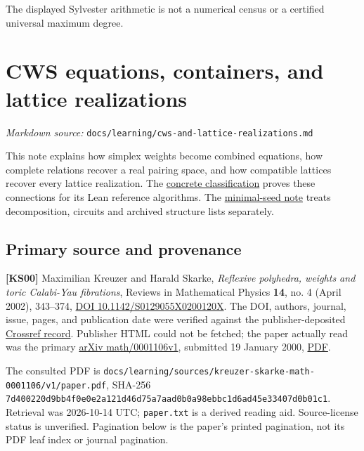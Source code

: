 \documentclass[11pt,a4paper,oneside]{report}
\begin{document}
The displayed Sylvester arithmetic is not a numerical census or a
certified universal maximum degree.

\chapter{CWS equations, containers, and lattice
realizations}\label{cws-and-lattice-realizations--cws-equations-containers-and-lattice-realizations}

\noindent\textit{Markdown source: }\texttt{docs/\allowbreak{}learning\allowbreak{}/\allowbreak{}cws-\allowbreak{}and-\allowbreak{}lattice-\allowbreak{}realizat\allowbreak{}ions.\allowbreak{}md}

This note explains how simplex weights become combined equations, how
complete relations recover a real pairing space, and how compatible
lattices recover every lattice realization. The
\href{../../proofs/STATEMENTS.md}{concrete classification} proves these
connections for its Lean reference algorithms. The
\hyperref[minimal-ip-circuits-and-types--minimal-ip-seeds-positive-circuits-and-finite-structure-data]{minimal-seed
note} treats decomposition, circuits and archived structure lists
separately.

\section{Primary source and
provenance}\label{cws-and-lattice-realizations--primary-source-and-provenance}

\textbf{{[}KS00{]}} Maximilian Kreuzer and Harald Skarke,
\emph{Reflexive polyhedra, weights and toric Calabi-Yau fibrations},
Reviews in Mathematical Physics \textbf{14}, no. 4 (April 2002),
343--374, \href{https://doi.org/10.1142/S0129055X0200120X}{DOI
10.\allowbreak{}1142/\allowbreak{}S0129055\allowbreak{}X0200120\allowbreak{}X}.
The DOI, authors, journal, issue, pages, and publication date were
verified against the publisher-deposited
\href{https://api.crossref.org/works/10.1142/S0129055X0200120X}{Crossref
record}. Publisher HTML could not be fetched; the paper actually read
was the primary \href{https://arxiv.org/abs/math/0001106v1}{arXiv
math/\allowbreak{}0001106v\allowbreak{}1}, submitted 19 January 2000,
\href{https://arxiv.org/pdf/math/0001106v1}{PDF}.

The consulted PDF is
\texttt{docs/\allowbreak{}learning\allowbreak{}/\allowbreak{}sources/\allowbreak{}kreuzer-\allowbreak{}skarke-\allowbreak{}math-\allowbreak{}0001106/\allowbreak{}v1/\allowbreak{}paper.\allowbreak{}pdf},
SHA-256
\texttt{7d400220\allowbreak{}d9bb4f0e\allowbreak{}0e2a121d\allowbreak{}46d75a7a\allowbreak{}ad0b0a98\allowbreak{}ebbc1d6a\allowbreak{}d45e3340\allowbreak{}7d0b01c1}.
Retrieval was 2026-10-14 UTC; \texttt{paper.\allowbreak{}txt} is a
derived reading aid. Source-license status is unverified. Pagination
below is the paper's printed pagination, not its PDF leaf index or
journal pagination.
\end{document}

